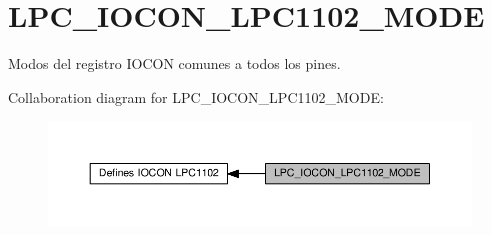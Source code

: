 \hypertarget{group___l_p_c___i_o_c_o_n___l_p_c1102___m_o_d_e}{}\section{L\+P\+C\+\_\+\+I\+O\+C\+O\+N\+\_\+\+L\+P\+C1102\+\_\+\+M\+O\+DE}
\label{group___l_p_c___i_o_c_o_n___l_p_c1102___m_o_d_e}


Modos del registro I\+O\+C\+ON comunes a todos los pines.  


Collaboration diagram for L\+P\+C\+\_\+\+I\+O\+C\+O\+N\+\_\+\+L\+P\+C1102\+\_\+\+M\+O\+DE\+:\nopagebreak
\begin{figure}[H]
\begin{center}
\leavevmode
\includegraphics[width=350pt]{group___l_p_c___i_o_c_o_n___l_p_c1102___m_o_d_e}
\end{center}
\end{figure}

